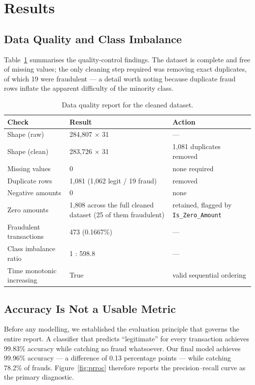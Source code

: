 \section{Results}
\label{sec:results}

\subsection{Data Quality and Class Imbalance}

Table~\ref{tab:qc} summarises the quality-control findings. The dataset is
complete and free of missing values; the only cleaning step required was
removing exact duplicates, of which 19 were fraudulent --- a detail worth noting
because duplicate fraud rows inflate the apparent difficulty of the minority
class.

\begin{table}[h!]
\centering
\caption{Data quality report for the cleaned dataset.}
\label{tab:qc}
\begin{tabular}{p{6.5cm}p{4cm}p{4cm}}
\toprule
\textbf{Check} & \textbf{Result} & \textbf{Action} \\
\midrule
Shape (raw) & 284{,}807 $\times$ 31 & --- \\
Shape (clean) & 283{,}726 $\times$ 31 & 1{,}081 duplicates removed \\
Missing values & 0 & none required \\
Duplicate rows & 1{,}081 (1{,}062 legit / 19 fraud) & removed \\
Negative amounts & 0 & none \\
Zero amounts & 1{,}808 across the full cleaned dataset (25 of them fraudulent) & retained, flagged by \texttt{Is\_Zero\_Amount} \\
Fraudulent transactions & 473 (0.1667\%) & --- \\
Class imbalance ratio & 1 : 598.8 & --- \\
Time monotonic increasing & True & valid sequential ordering \\
\bottomrule
\end{tabular}
\end{table}

\subsection{Accuracy Is Not a Usable Metric}

Before any modelling, we established the evaluation principle that governs the
entire report. A classifier that predicts ``legitimate'' for every transaction
achieves 99.83\% accuracy while catching no fraud whatsoever. Our final model
achieves 99.96\% accuracy --- a difference of 0.13 percentage points --- while
catching 78.2\% of frauds. Figure~\ref{fig:prroc} therefore reports the
precision--recall curve as the primary diagnostic.


